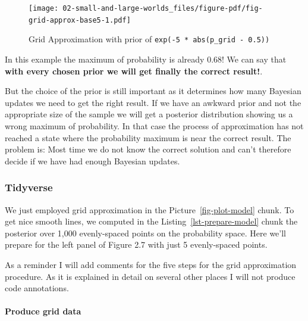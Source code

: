 \documentclass[
  letterpaper,
  DIV=11,
  numbers=noendperiod]{scrreprt}
\let\oldparagraph\paragraph
\renewcommand{\paragraph}[1]{\oldparagraph{#1}\mbox{}}
\begin{document}
\begin{figure}[H]

{\centering \texttt{[image: 02-small-and-large-worlds\_files/figure-pdf/fig-grid-approx-base5-1.pdf]}

}

\caption{\label{fig-grid-approx-base5}Grid Approximation with prior of
\texttt{exp(-5\ *\ abs(p\_grid\ -\ 0.5))}}

\end{figure}

In this example the maximum of probability is already 0.68! We can say
that \textbf{with every chosen prior we will get finally the correct
result!}.

But the choice of the prior is still important as it determines how many
Bayesian updates we need to get the right result. If we have an awkward
prior and not the appropriate size of the sample we will get a posterior
distribution showing us a wrong maximum of probability. In that case the
process of approximation has not reached a state where the probability
maximum is near the correct result. The problem is: Most time we do not
know the correct solution and can't therefore decide if we have had
enough Bayesian updates.

\hypertarget{tidyverse-6}{%
\subsubsection{Tidyverse}\label{tidyverse-6}}

We just employed grid approximation in the Picture~\ref{fig-plot-model}
chunk. To get nice smooth lines, we computed in the
Listing~\ref{lst-prepare-model} chunk the posterior over 1,000
evenly-spaced points on the probability space. Here we'll prepare for
the left panel of Figure 2.7 with just 5 evenly-spaced points.

As a reminder I will add comments for the five steps for the grid
approximation procedure. As it is explained in detail on several other
places I will not produce code annotations.

\hypertarget{produce-grid-data}{%
\paragraph{Produce grid data}\label{produce-grid-data}}
\end{document}
